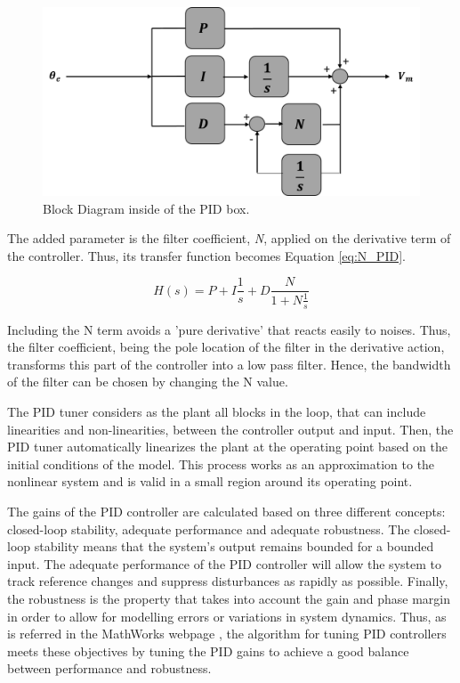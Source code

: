\begin{figure}[H]
\centering
\includegraphics[scale=0.6]{figures/controller_box.png}
\caption{Block Diagram inside of the PID box.}
\label{PID_box_N}
\end{figure}

The added parameter is the filter coefficient, \textit{N}, applied on the derivative term of the controller. Thus, its transfer function becomes Equation \ref{eq:N_PID}.

\begin{equation}\label{eq:N_PID}
H(s) = P + I\frac{1}{s} + D\frac{N}{1+N\frac{1}{s}}
\end{equation}

Including the N term avoids a 'pure derivative' that reacts easily to noises. Thus, the filter coefficient, being the pole location of the filter in the derivative action, transforms this part of the controller into a low pass filter. Hence, the bandwidth of the filter can be chosen by changing the N value.\par

\vspace{5mm}


The PID tuner considers as the plant all blocks in the loop, that can include linearities and non-linearities, between the controller output and input. Then, the PID tuner automatically linearizes the plant at the operating point based on the initial conditions of the model. This process works as an approximation to the nonlinear system and is valid in a small region around its operating point.\par

The gains of the PID controller are calculated based on three different concepts: closed-loop stability, adequate performance and adequate robustness. The closed-loop stability means that the system’s output remains bounded for a bounded input. The adequate performance of the PID controller will allow the system to track reference changes and suppress disturbances as rapidly as possible. Finally, the robustness is the property that takes into account the gain and phase margin in order to allow for modelling errors or variations in system dynamics. Thus, as is referred in the MathWorks webpage \cite{mathworks}, the algorithm for tuning PID controllers meets these objectives by tuning the PID gains to achieve a good balance between performance and robustness.



